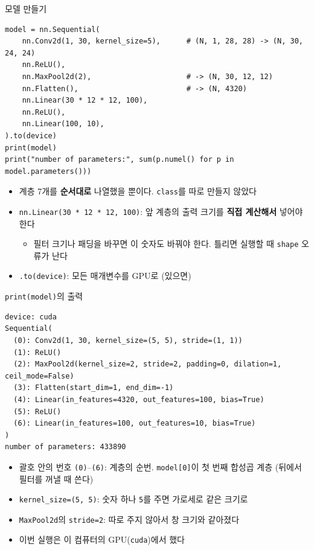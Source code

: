 \documentclass[aspectratio=169,11pt]{beamer}
\newcommand{\code}[1]{\texttt{#1}}
\begin{document}
\begin{frame}[fragile]{모델 만들기}
\begin{lstlisting}
model = nn.Sequential(
    nn.Conv2d(1, 30, kernel_size=5),      # (N, 1, 28, 28) -> (N, 30, 24, 24)
    nn.ReLU(),
    nn.MaxPool2d(2),                      # -> (N, 30, 12, 12)
    nn.Flatten(),                         # -> (N, 4320)
    nn.Linear(30 * 12 * 12, 100),
    nn.ReLU(),
    nn.Linear(100, 10),
).to(device)
print(model)
print("number of parameters:", sum(p.numel() for p in model.parameters()))
\end{lstlisting}
\begin{itemize}
\item 계층 7개를 \textbf{순서대로} 나열했을 뿐이다. \code{class}를 따로 만들지 않았다
\item \code{nn.Linear(30 * 12 * 12, 100)}: 앞 계층의 출력 크기를 \textbf{직접 계산해서} 넣어야 한다
\begin{itemize}
\item 필터 크기나 패딩을 바꾸면 이 숫자도 바꿔야 한다. 틀리면 실행할 때 \code{shape} 오류가 난다
\end{itemize}
\item \code{.to(device)}: 모든 매개변수를 GPU로 (있으면)
\end{itemize}
\end{frame}

\begin{frame}[fragile]{\code{print(model)}의 출력}
\begin{lstlisting}[style=outstyle]
device: cuda
Sequential(
  (0): Conv2d(1, 30, kernel_size=(5, 5), stride=(1, 1))
  (1): ReLU()
  (2): MaxPool2d(kernel_size=2, stride=2, padding=0, dilation=1, ceil_mode=False)
  (3): Flatten(start_dim=1, end_dim=-1)
  (4): Linear(in_features=4320, out_features=100, bias=True)
  (5): ReLU()
  (6): Linear(in_features=100, out_features=10, bias=True)
)
number of parameters: 433890
\end{lstlisting}
\small
\begin{itemize}
\item 괄호 안의 번호 \code{(0)}--\code{(6)}: 계층의 순번. \code{model[0]}이 첫 번째 합성곱 계층 (뒤에서 필터를 꺼낼 때 쓴다)
\item \code{kernel\_size=(5, 5)}: 숫자 하나 \code{5}를 주면 가로세로 같은 크기로
\item \code{MaxPool2d}의 \code{stride=2}: 따로 주지 않아서 창 크기와 같아졌다
\item 이번 실행은 이 컴퓨터의 GPU(\code{cuda})에서 했다
\end{itemize}
\end{frame}
\end{document}
